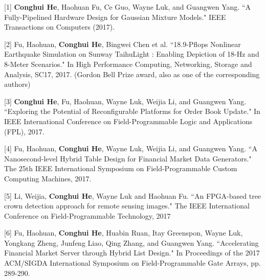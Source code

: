 \documentclass[11pt, a4paper]{awesome-cv}
\begin{document}


\begin{cvparagraph}

[1] \hspace{0.5mm} \textbf{Conghui He}, Haohuan Fu, Ce Guo, Wayne Luk, and Guangwen Yang. ``A Fully-Pipelined Hardware Design for Gaussian Mixture Models." IEEE Transactions on Computers (2017).

[2] \hspace{0.5mm} Fu, Haohuan, \textbf{Conghui He}, Bingwei Chen et al. ``18.9-Pflops Nonlinear Earthquake Simulation on Sunway TaihuLight : Enabling Depiction of 18-Hz and 8-Meter Scenarios." In High Performance Computing, Networking, Storage and Analysis, SC17, 2017. (Gordon Bell Prize award, also as one of the corresponding authors)

[3] \hspace{0.5mm} \textbf{Conghui He}, Fu, Haohuan, Wayne Luk, Weijia Li, and Guangwen Yang. ``Exploring the Potential of Reconfigurable Platforms for Order Book Update." In IEEE International Conference on Field-Programmable Logic and Applications (FPL), 2017.

[4] \hspace{0.5mm} Fu, Haohuan, \textbf{Conghui He}, Wayne Luk, Weijia Li, and Guangwen Yang. ``A Nanosecond-level Hybrid Table Design for Financial Market Data Generators." The 25th IEEE International Symposium on Field-Programmable Custom Computing Machines, 2017.

[5] \hspace{0.5mm} Li, Weijia, \textbf{Conghui He}, Wayne Luk and Haohuan Fu. ``An FPGA-based tree crown detection approach for remote sensing images." The IEEE International Conference on Field-Programmable Technology, 2017

[6] \hspace{0.5mm} Fu, Haohuan, \textbf{Conghui He}, Huabin Ruan, Itay Greenspon, Wayne Luk, Yongkang Zheng, Junfeng Liao, Qing Zhang, and Guangwen Yang. ``Accelerating Financial Market Server through Hybrid List Design." In Proceedings of the 2017 ACM/SIGDA International Symposium on Field-Programmable Gate Arrays, pp. 289-290. 


\end{cvparagraph}
\end{document}
